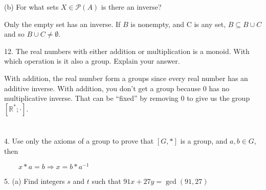 \documentclass{article}
\begin{document}
(b) For what sets \(X\in \mathcal{P}(A)\) is there an inverse?



Only the empty set has an inverse. { } If \(B\) is nonempty, and C is any set, \(B \subseteq B\cup C\) and so \(B\cup C \neq \emptyset\).



12. The real numbers with either addition or multiplication is a monoid. With which operation is it also a group. { }Explain your answer. 



With addition, the real number form a groups since every real number has an additive inverse. { } With addition, you don{'}t get a group because
0 has no multiplicative inverse. { } That can be {``}fixed{''} by removing 0 to give us the group \(\left[\mathbb{R}^*; \cdot \right]\).


\section{}



4. { } Use only the axioms of a group to prove that \([G,*]\) is a group, and \(a,b\in  G\), then



$\quad \quad $\(x*a= b \Longrightarrow  x=b*a^{-1}\)



5. { }(a) { }Find integers \(s\) and \(t\) such that \(91x + 27 y = \gcd (91,27)\)
\end{document}
